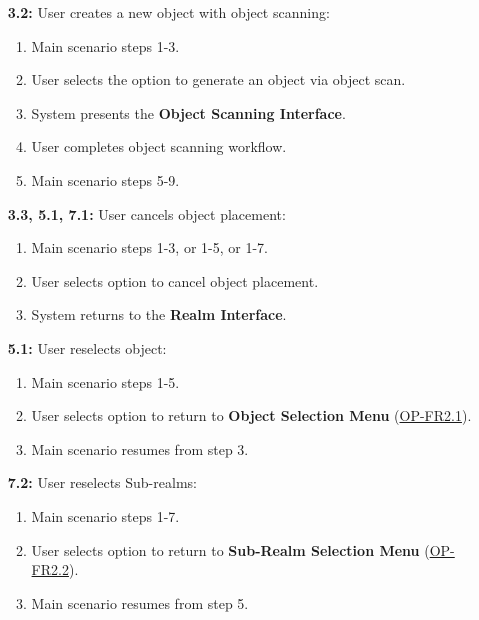 \documentclass{article}
\begin{document}
\begin{enumerate}[label=\textbf{UC\arabic*}]
\begin{itemize}
              \item[{\bf 3.2:}] User creates a new object with object scanning:
                    \begin{enumerate}[label=\textbf{\arabic*.}]
                        \item Main scenario steps 1-3.
                        \item User selects the option to generate an object via object scan.
                        \item System presents the \textbf{Object Scanning Interface}.
                        \item User completes object scanning workflow.
                        \item Main scenario steps 5-9.
                    \end{enumerate}

              \item[{\bf 3.3, 5.1, 7.1:}] User cancels object placement:
                    \begin{enumerate}[label=\textbf{\arabic*.}]
                        \item Main scenario steps 1-3, or 1-5, or 1-7.
                        \item User selects option to cancel object placement.
                        \item System returns to the \textbf{Realm Interface}.
                    \end{enumerate}

              \item[{\bf 5.1:}] User reselects object:
                    \begin{enumerate}[label=\textbf{\arabic*.}]
                        \item Main scenario steps 1-5.
                        \item User selects option to return to \textbf{Object Selection Menu} (\hyperref[ssub:object_placement]{OP-FR2.1}).
                        \item Main scenario resumes from step 3.
                    \end{enumerate}

              \item[{\bf 7.2:}] User reselects Sub-realms:
                    \begin{enumerate}[label=\textbf{\arabic*.}]
                        \item Main scenario steps 1-7.
                        \item User selects option to return to \textbf{Sub-Realm Selection Menu} (\hyperref[ssub:object_placement]{OP-FR2.2}).
                        \item Main scenario resumes from step 5.
                    \end{enumerate}
          \end{itemize}


\end{enumerate}
\end{document}
